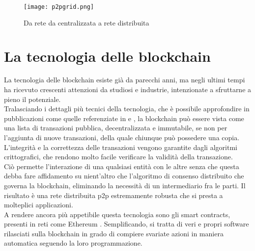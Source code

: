 \begin{figure}[h]
    \texttt{[image: p2pgrid.png]}
    \centering
    \caption{Da rete da centralizzata a rete distribuita \cite{img:p2pgrid}}
    \label{lab:p2pgrid}
\end{figure}


\section{La tecnologia delle blockchain}
La tecnologia delle blockchain esiste già da parecchi anni, ma negli ultimi tempi ha ricevuto crescenti attenzioni da studiosi e industrie, intenzionate a sfruttarne a pieno il potenziale. \\
Tralasciando i dettagli più tecnici della tecnologia, che è possibile approfondire in pubblicazioni come quelle referenziate in \cite{art:blockchain} e \cite{art:blockchain-for-industry},
la blockchain può essere vista come una lista di transazioni pubblica, decentralizzata e immutabile, se non per l'aggiunta di nuove transazioni, della quale chiunque può possedere una copia. \\
L'integrità e la correttezza delle transazioni vengono garantite dagli algoritmi crittografici, che rendono molto facile verificare la validità della transazione. \\
Ciò permette l'interazione di una qualsiasi entità con le altre senza che questa debba fare affidamento su nient'altro che l'algoritmo di consenso distribuito che governa la blockchain, eliminando la necessità di un intermediario fra le parti.
Il risultato è una rete distribuita \gls{p2p} estremamente robusta che si presta a molteplici applicazioni. \\
A rendere ancora più appetibile questa tecnologia sono gli smart contracts, presenti in reti come Ethereum \cite{wiki:eth-smart-contracts}. Semplificando, si tratta di veri e propri software rilasciati sulla blockchain
in grado di compiere svariate azioni in maniera automatica seguendo la loro programmazione.